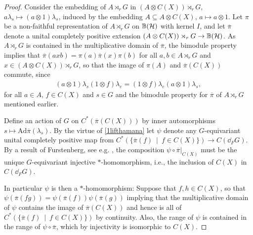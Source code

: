 \begin{proof}
	Consider the embedding of $A \rtimes_r G$ in $(A \otimes C(X)) \rtimes_r G$,  $a \lambda_s \mapsto (a \otimes 1) \lambda_s$, induced by the embedding $A \subseteq A \otimes C(X)$, $a \mapsto a \otimes 1$. Let $\pi$ be a non-faithful representation of $A \rtimes_r G$ on $\mathbb{B}(\mathcal{H})$ with kernel $I$, and let $\overline \pi$ denote a unital completely positive extension $(A \otimes C(X)) \rtimes_r G \to \mathbb{B}(\mathcal{H})$. As $A \rtimes_r G$ is contained in the multiplicative domain of $\overline \pi$, the bimodule property implies that $\overline \pi(axb) = \pi(a) \overline \pi(x) \pi(b)$ for all $a,b \in A \rtimes_r G$ and $x \in (A \otimes C(X)) \rtimes_r G$, so that the image of $\pi(A)$ and $\overline \pi(C(X))$ commute, since
	\begin{align*}
		(a \otimes 1 )\lambda_s (1 \otimes f ) \lambda_e = (1 \otimes f) \lambda_e (a \otimes 1) \lambda_s,
	\end{align*}
	for all $ a \in A$, $f \in C(X)$ and $s \in G$ and the bimodule property for $\overline \pi$ of $A \rtimes_r G$ mentioned earlier. 

	Define an action of $G$ on $C^*(\overline \pi(C(X)))$ by inner automorphisms $s \mapsto \mathrm{Ad} \overline \pi(\lambda_s)$. By the virtue of \cref{1lifthamana} let $\psi$ denote any $G$-equivariant unital completely positive map from $C^*(\{\overline \pi (f) \ \mid \ f \in C(X) \}) \to C(\dd_F G)$. By a result of Furstenberg, see e.g. \cite[lemma 4.16 + proposition 4.23]{bscp}, the composition $\psi \circ \overline \pi|_{C(X)}$ must be the unique $G$-equivariant injective $*$-homomorphism, i.e., the inclusion of $C(X)$ in $C(\dd_F G)$.

	In particular $\psi$ is then a $*$-homomorphism: Suppose that $f,h \in C(X)$, so that $\psi ( \overline \pi(fg))= \psi (\overline \pi(f)) \psi ( \overline \pi(g))$ implying that the multiplicative domain of $\psi$ contains the image of $\overline \pi(C(X))$ and hence is all of $C^*(\{\overline \pi(f) \ \mid \ f \in C(X)\})$ by continuity. Also, the range of $\psi$ is contained in the range of $\psi \circ \overline \pi$, which by injectivity is isomorphic to $C(X)$.


\end{proof}
